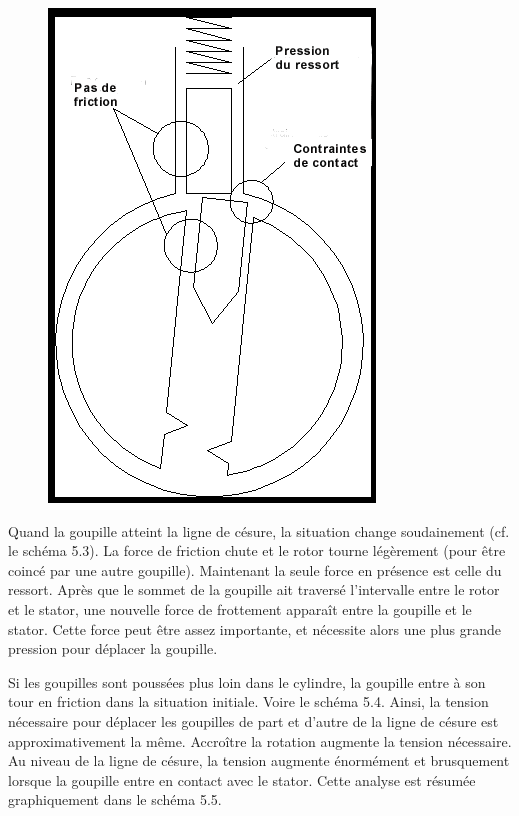 \documentclass[a4paper,french,11pt,twoside]{report}
\begin{document}
\begin{figure}[h] \begin{center}
        \includegraphics[scale=0.7]{images/Image11}
        \caption{}
\end{center} \end{figure}

Quand la goupille atteint la ligne de césure, la situation change soudainement (cf. le schéma 5.3). La force de friction chute et le rotor tourne légèrement (pour être coincé par une autre goupille). Maintenant la seule force en présence est celle du ressort. Après que le sommet de la goupille ait traversé l'intervalle entre le rotor et le stator, une nouvelle force de frottement apparaît entre la goupille et le stator. Cette force peut être assez importante, et nécessite alors une plus grande pression pour déplacer la goupille.

Si les goupilles sont poussées plus loin dans le cylindre, la goupille entre à son tour en friction dans la situation initiale. Voire le schéma 5.4. Ainsi, la tension nécessaire pour déplacer les goupilles de part et d'autre de la ligne de césure est approximativement la même. Accroître la rotation augmente la tension nécessaire. Au niveau de la ligne de césure, la tension augmente énormément et brusquement lorsque la goupille entre en contact avec le stator. Cette analyse est résumée graphiquement dans le schéma 5.5.
\end{document}
